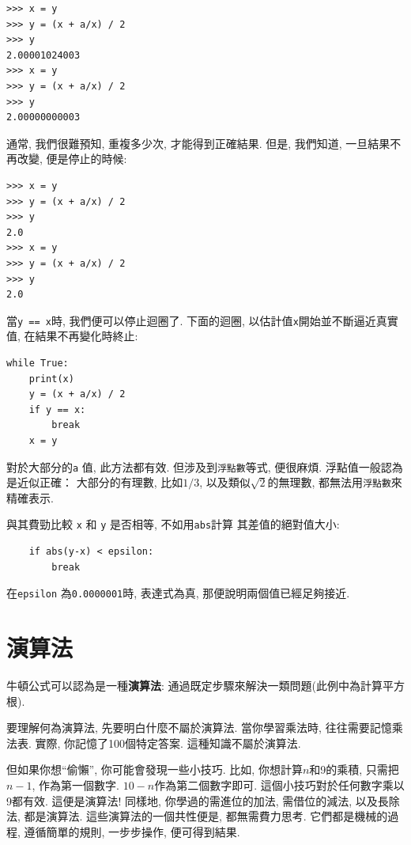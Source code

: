 \documentclass[10pt]{book}
\begin{document}
\begin{verbatim}
>>> x = y
>>> y = (x + a/x) / 2
>>> y
2.00001024003
>>> x = y
>>> y = (x + a/x) / 2
>>> y
2.00000000003
\end{verbatim}
%
通常, 我們很難預知, 重複多少次, 才能得到正確結果. 
但是, 我們知道, 一旦結果不再改變, 便是停止的時候:

\begin{verbatim}
>>> x = y
>>> y = (x + a/x) / 2
>>> y
2.0
>>> x = y
>>> y = (x + a/x) / 2
>>> y
2.0
\end{verbatim}
%
當{\tt y == x}時, 我們便可以停止迴圈了. 
下面的迴圈, 以估計值{\tt x}開始並不斷逼近真實值, 在結果不再變化時終止:

\begin{verbatim}
while True:
    print(x)
    y = (x + a/x) / 2
    if y == x:
        break
    x = y
\end{verbatim}
%
對於大部分的{\tt a} 值, 此方法都有效. 
但涉及到{\tt 浮點數}等式, 便很麻煩. 
浮點值一般認為是近似正確：
大部分的有理數, 比如$1/3$, 
以及類似$\sqrt{2}$的無理數, 都無法用{\tt 浮點數}來精確表示. 

與其費勁比較 {\tt x} 和 {\tt y} 是否相等, 不如用{\tt abs}計算
其差值的絕對值大小:

\begin{verbatim}
    if abs(y-x) < epsilon:
        break
\end{verbatim}
%
在\verb"epsilon" 為{\tt 0.0000001}時, 表達式為真, 
那便說明兩個值已經足夠接近. 


\section{演算法}
牛頓公式可以認為是一種{\bf 演算法}:
通過既定步驟來解決一類問題(此例中為計算平方根). 

要理解何為演算法, 先要明白什麼不屬於演算法. 
當你學習乘法時, 往往需要記憶乘法表. 
實際, 你記憶了100個特定答案. 這種知識不屬於演算法. 

但如果你想``偷懶'', 你可能會發現一些小技巧. 
比如, 你想計算$n$和9的乘積, 只需把$n-1$, 作為第一個數字. 
$10-n$作為第二個數字即可. 這個小技巧對於任何數字乘以9都有效. 
這便是演算法!
同樣地, 你學過的需進位的加法, 需借位的減法, 以及長除法, 
都是演算法. 這些演算法的一個共性便是, 都無需費力思考. 
它們都是機械的過程, 
遵循簡單的規則, 一步步操作, 便可得到結果. 
\end{document}
